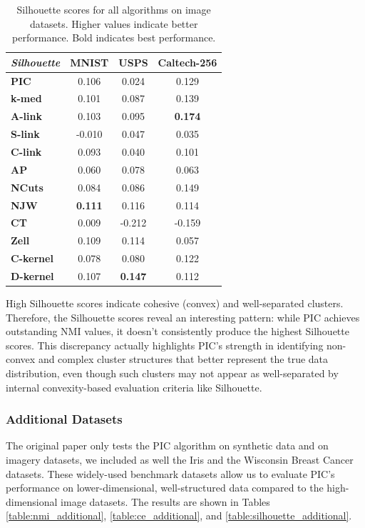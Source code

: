 \begin{table}[h]
    \centering
    \begin{tabular}{|l|c|c|c|}
    \hline
    \textit{Silhouette} & \textbf{MNIST} & \textbf{USPS} & \textbf{Caltech-256} \\
    \hline
    \textbf{PIC}       & 0.106 & 0.024 & 0.129 \\ \hline
    \textbf{k-med}     & 0.101 & 0.087 & 0.139 \\ \hline
    \textbf{A-link}    & 0.103 & 0.095 & \textbf{0.174} \\ \hline
    \textbf{S-link}    & -0.010 & 0.047 & 0.035 \\ \hline
    \textbf{C-link}    & 0.093 & 0.040 & 0.101 \\ \hline
    \textbf{AP}        & 0.060 & 0.078 & 0.063 \\ \hline
    \textbf{NCuts}     & 0.084 & 0.086 & 0.149 \\ \hline
    \textbf{NJW}       & \textbf{0.111} & 0.116 & 0.114 \\ \hline
    \textbf{CT}        & 0.009 & -0.212 & -0.159 \\ \hline
    \textbf{Zell}      & 0.109 & 0.114 & 0.057 \\ \hline
    \textbf{C-kernel}  & 0.078 & 0.080 & 0.122 \\ \hline
    \textbf{D-kernel}  & 0.107 & \textbf{0.147} & 0.112 \\
    \hline
    \end{tabular}
    \caption{Silhouette scores for all algorithms on image datasets. Higher values indicate better performance. Bold indicates best performance.}
    \label{table:silhouette}
\end{table}

High Silhouette scores indicate cohesive (convex) and well-separated clusters. Therefore, the Silhouette scores reveal an interesting pattern: while PIC achieves outstanding NMI values, it doesn't consistently produce the highest Silhouette scores. This discrepancy actually highlights PIC's strength in identifying non-convex and complex cluster structures that better represent the true data distribution, even though such clusters may not appear as well-separated by internal convexity-based evaluation criteria like Silhouette.

\subsubsection{Additional Datasets}
The original paper only tests the PIC algorithm on synthetic data and on imagery datasets, we included as well the Iris and the Wisconsin Breast Cancer datasets. These widely-used benchmark datasets allow us to evaluate PIC's performance on lower-dimensional, well-structured data compared to the high-dimensional image datasets. The results are shown in Tables \ref{table:nmi_additional}, \ref{table:ce_additional}, and \ref{table:silhouette_additional}.

